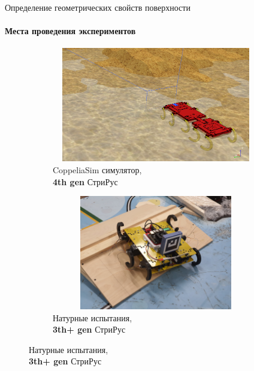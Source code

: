 \documentclass[aspectratio=169,xcolor=table]{beamer}
\begin{document}
\begin{frame}[t]{Определение геометрических свойств поверхности}
    \framesubtitle{Места проведения экспериментов}
    \vspace{-15pt}
    \begin{figure}[H]
        \begin{subfigure}[t]{0.49\textwidth}
            \centering\includegraphics[height=5cm,width=1\textwidth,keepaspectratio]{coppelia_sim.png}
            \caption*{CoppeliaSim симулятор,\\ \textbf{4th gen} СтриРус}
        \end{subfigure}
        \begin{subfigure}[t]{0.49\textwidth}
            \centering\includegraphics[height=5cm,width=1\textwidth,keepaspectratio]{rl_sim.JPG}
            \caption*{Натурные испытания,\\ \textbf{3th+ gen} СтриРус}
        \end{subfigure}
    \end{figure}
\end{frame}
\end{document}
